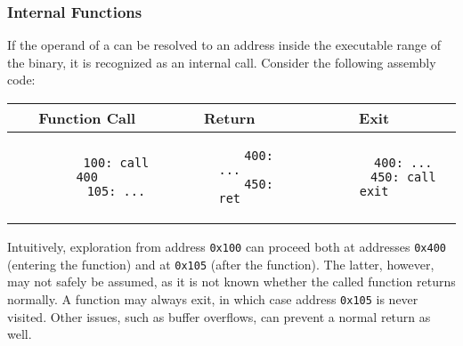\subsubsection{Internal Functions}
If the operand of a  can be resolved to an address inside the executable range of the binary, it is recognized as an internal call.
Consider the following assembly code:

\begin{center}
  \begin{tabular}{ccc}
    \textbf{Function Call} & \textbf{Return} & \textbf{Exit} \\\hline
    \begin{minipage}{0.3\linewidth}
      \vspace{0.5ex}
      \begin{verbatim}
        100: call 400
        105: ...
      \end{verbatim}
      \vspace{-0.2ex}
    \end{minipage}
    &
    \begin{minipage}{0.2\linewidth}
      \vspace{0.5ex}
      \begin{verbatim}
        400: ...
        450: ret
      \end{verbatim}
      \vspace{-0.2ex}
    \end{minipage}
    &\begin{minipage}{0.3\linewidth}
      \vspace{0.5ex}
      \begin{verbatim}
        400: ...
        450: call exit
      \end{verbatim}
      \vspace{-0.2ex}
    \end{minipage}
    \\\hline
  \end{tabular}
\end{center}
Intuitively, exploration from address \texttt{0x100} can proceed both at addresses \texttt{0x400} (entering the function) and at \texttt{0x105} (after the function).
The latter, however, may not safely be assumed, as it is not known whether the called function returns normally.
A function may always exit, in which case address \texttt{0x105} is never visited.
Other issues, such as buffer overflows, can prevent a normal return as well.

